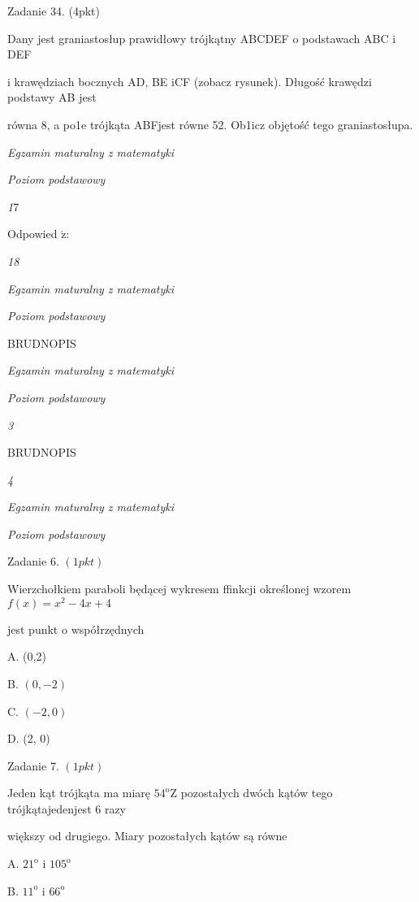 \documentclass[a4paper,12pt]{article}
\begin{document}
Zadanie 34. (4pkt)

Dany jest graniastosłup prawidłowy trójkątny ABCDEF o podstawach ABC i DEF

i krawędziach bocznych AD, BE iCF (zobacz rysunek). Długość krawędzi podstawy AB jest

równa 8, a po1e trójkąta ABFjest równe 52. Ob1icz objętość tego graniastosłupa.





{\it Egzamin maturalny z matematyki}

{\it Poziom podstawowy}

{\it 1}7

Odpowied $\acute{\mathrm{z}}$:





{\it 18}

{\it Egzamin maturalny z matematyki}

{\it Poziom podstawowy}

BRUDNOPIS





{\it Egzamin maturalny z matematyki}

{\it Poziom podstawowy}

{\it 3}

BRUDNOPIS





{\it 4}

{\it Egzamin maturalny z matematyki}

{\it Poziom podstawowy}

Zadanie 6. $(1pkt)$

Wierzchołkiem paraboli będącej wykresem ffinkcji określonej wzorem $f(x)=x^{2}-4x+4$

jest punkt o współrzędnych

A. (0,2)

B. $(0,-2)$

C. $(-2,0)$

D. (2, 0)

Zadanie 7. $(1pkt)$

Jeden kąt trójkąta ma miarę $54^{\mathrm{o}} \mathrm{Z}$ pozostałych dwóch kątów tego trójkątajedenjest 6 razy

większy od drugiego. Miary pozostałych kątów są równe

A. $21^{\mathrm{o}}$ i $105^{\mathrm{o}}$

B. $11^{\mathrm{o}}$ i $66^{\mathrm{o}}$
\end{document}
